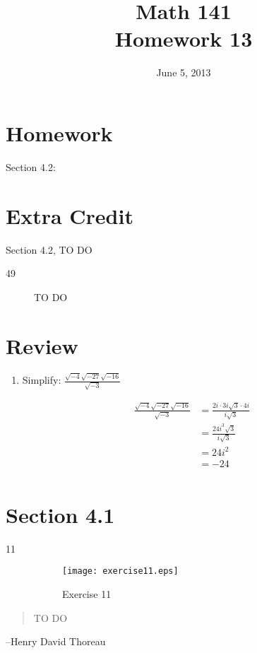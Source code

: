 \documentclass{exam}
\date{June 5, 2013}
\author{}
\title{Math 141 \\ Homework 13}
\begin{document}
  \maketitle

  \section{Homework}

  Section 4.2: 

  \section{Extra Credit}
  Section 4.2, TO DO

  \ifprintanswers
    \begin{description}
      \item[49] TO DO
    \end{description}

  \section{Review}

  \begin{enumerate}
    \item Simplify: $\frac{\sqrt{-4}\sqrt{-27}\sqrt{-16}}{\sqrt{-3}}$
      \begin{solution}
        \begin{align*}
          \frac{\sqrt{-4}\sqrt{-27}\sqrt{-16}}{\sqrt{-3}} &= \frac{2i \cdot 3i \sqrt{3} \cdot 4i}{i \sqrt{3}} \\
          &= \frac{24i^3 \sqrt{3}}{i \sqrt{3}} \\
          &= 24 i^2 \\
          &= -24 \\
        \end{align*}
      \end{solution}

  \end{enumerate}
    \section{Section 4.1}

    \begin{description}

      \item[11] 
        \begin{figure}[H]
          \centering
          \texttt{[image: exercise11.eps]}
          \caption*{Exercise 11}
        \end{figure}

    \end{description}

  \else
    \vspace{6 cm}
    \begin{quote}
      \begin{em}
        TO DO
      \end{em}
    \end{quote}

    \hspace{1 cm} --Henry David Thoreau
  \fi
\end{document}
